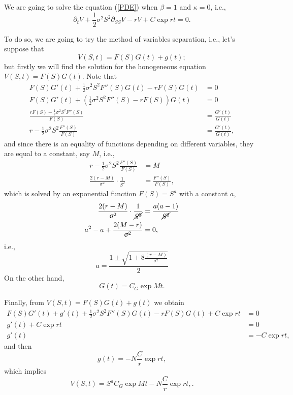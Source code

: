 We are going to solve the equation (\ref{PDE}) when $\beta = 1$ and $\kappa = 0$, i.e.,
\begin{equation}
	\partial_t V + \frac{1}{2}\sigma^2 S^2 \partial_{SS}V -r V + C\exp{rt}= 0.
\end{equation}

To do so, we are going to try the method of variables separation, i.e., let's suppose that 
\begin{equation}
	V(S,t) = F(S)G(t) + g(t);
\end{equation}
but firstly we will find the solution for the honogeneous equation $V(S,t) = F(S)G(t)$. Note that
$$
	\begin{aligned}
		F(S) G'(t) + \frac{1}{2}\sigma^2 S^2 F''(S)G(t) - r F(S)G(t)			 &= 0 \\
		F(S) G'(t) + \left(\frac{1}{2}\sigma^2 S^2 F''(S) - r F(S)\right) G(t) 	&= 0\\
		\frac{rF(S) - \frac{1}{2}\sigma^2S^2 F''(S)}{F(S)}						&=  \frac{G'(t)}{G(t)}\\
		r - \frac{1}{2}\sigma^2 S^2 \frac{F''(S)}{F(S)} 						&=  \frac{G'(t)}{G(t)},
	\end{aligned}
$$
and since there is an equality of functions depending on different variables, they are equal to a constant, say $M$, i.e., 
$$
	\begin{aligned}
			r - \frac{1}{2}\sigma^2 S^2 \frac{F''(S)}{F(S)}  	&= M \\
			 \frac{2(r-M)}{\sigma^2}\cdot \frac{1}{S^2} 			&= \frac{F''(S)}{F(S)},
	\end{aligned}
$$
which is solved by an exponential function $F(S) = S^a$ with a constant $a$,
$$
	\begin{aligned}
		 \frac{2(r-M)}{\sigma^2}\cdot \frac{1}{\cancel{S^2}} 			&= \frac{a(a-1)}{\cancel{S^2}}\\
		 a^2 - a +  \frac{2(M-r)}{\sigma^2} &= 0,
	\end{aligned}
$$
i.e., 
\begin{equation}
	a = \frac{1\pm\sqrt{1+8\frac{(r-M)}{\sigma^2}}}{2}
\end{equation}
On the other hand,
$$
	G(t) = C_G \exp{M t}.
$$

Finally, from $V(S,t) = F(S)G(t) + g(t)$ we obtain
$$
	\begin{aligned}
			F(S) G'(t) + g'(t) + \frac{1}{2}\sigma^2 S^2 F''(S)G(t) - r F(S)G(t)	+ C\exp{rt}		 &= 0\\
			g'(t) + C\exp{rt} &= 0\\
			g'(t) &= -C\exp{rt},
	\end{aligned}
$$ 
and then
\begin{equation}
	g(t) = - N \frac{C}{r}\exp{rt},
\end{equation}
which implies
\begin{equation}
	V(S,t) = S^a  C_G \exp{M t} - N \frac{C}{r}\exp{rt},. 
\end{equation}

